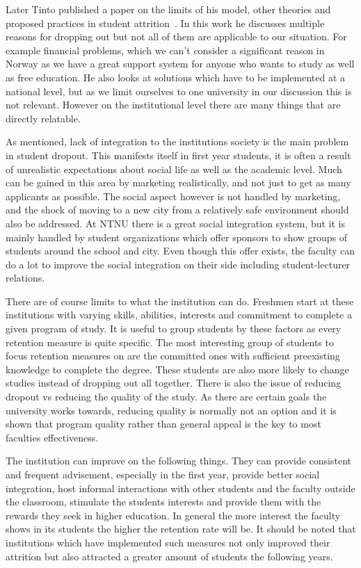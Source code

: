 \bigskip\noindent
Later Tinto published a paper on the limits of his model, other theories and proposed practices in student attrition~\cite{1982}.
In this work he discusses multiple reasons for dropping out but not all of them are applicable to our situation. For example financial problems, which we can't consider a significant reason in Norway as we have a great support system for anyone who wants to study as well as free education.
He also looks at solutions which have to be implemented at a national level, but as we limit ourselves to one university in our discussion this is not relevant.
However on the institutional level there are many things that are directly relatable.

\bigskip\noindent
As mentioned, lack of integration to the institutions society is the main problem in student dropout.
This manifests itself in first year students, it is often a result of unrealistic expectations about social life as well as the academic level.
Much can be gained in this area by marketing realistically, and not just to get as many applicants as possible.
The social aspect however is not handled by marketing, and the shock of moving to a new city from a relatively safe environment should also be addressed.
At NTNU there is a great social integration system, but it is mainly handled by student organizations which offer sponsors to show groups of students around the school and city.
Even though this offer exists, the faculty can do a lot to improve the social integration on their side including student-lecturer relations.

\bigskip\noindent
There are of course limits to what the institution can do.
Freshmen start at these institutions with varying skills, abilities, interests and commitment to complete a given program of study.
It is useful to group students by these factors as every retention measure is quite specific.
The most interesting group of students to focus retention measures on are the committed ones with sufficient preexisting knowledge to complete the degree.
These students are also more likely to change studies instead of dropping out all together.
There is also the issue of reducing dropout vs reducing the quality of the study.
As there are certain goals the university works towards, reducing quality is normally not an option and it is shown that program quality rather than general appeal is the key to most faculties effectiveness.

\bigskip\noindent
The institution can improve on the following things.
They can provide consistent and frequent advisement, especially in the first year,
provide better social integration,
host informal interactions with other students and the faculty outside the classroom,
stimulate the students interests and provide them with the rewards they seek in higher education.
In general the more interest the faculty shows in its students the higher the retention rate will be.
It should be noted that institutions which have implemented such measures not only improved their attrition but also attracted a greater amount of students the following years.

